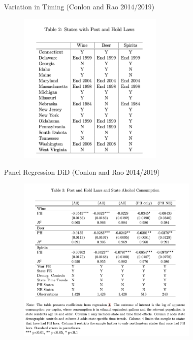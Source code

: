 \documentclass[xcolor=pdftex,dvipsnames,table,mathserif,aspectratio=169]{beamer}
\begin{document}
\begin{frame}{Variation in Timing (Conlon and Rao 2014/2019)}
\begin{figure}
\centering
\includegraphics[width=2.8in]{./resources/conlon_rao_table2.png}
\end{figure}
\end{frame}



\begin{frame}{Panel Regression DiD (Conlon and Rao 2014/2019)}
\begin{figure}
\centering
\includegraphics[width=3.5in]{./resources/conlon_rao_dd.png}
\end{figure}
\end{frame}
\end{document}
